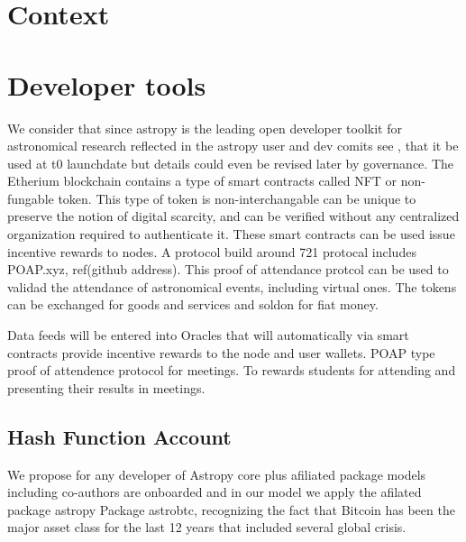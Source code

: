 \documentclass[final,5p,times,twocolumn,authoryear]{elsarticle}
\begin{document}
\section{Context}
\label{section:context}
%


\section{Developer tools}
\label{section:Eth721}
%
We consider that since astropy is the leading open developer toolkit for astronomical research reflected in the astropy  user and dev comits see \cite{ 2020ASPC..522..491T}, that it be used at t0 launchdate but details could even be revised later by governance.  The Etherium blockchain contains a type of smart contracts called NFT or non-fungable token.  This type of token is non-interchangable can be unique to preserve the notion of digital scarcity, and can be verified without any centralized organization required to authenticate it. These smart contracts can be used issue incentive rewards to nodes. A protocol build around 721 protocal includes POAP.xyz, ref(github address). This proof of attendance protcol can be used to validad the attendance of astronomical events, including virtual ones. The tokens can be exchanged for goods and services and soldon for fiat money.  


Data feeds will be entered into Oracles that will automatically via smart contracts provide incentive rewards to the node and user wallets.
%
POAP type proof of attendence protocol for meetings. To rewards students for attending and presenting their results in meetings.
%
\subsection{Hash Function Account}
We propose for any developer of Astropy core plus afiliated package models including co-authors are onboarded and in our model we apply the afilated package astropy Package astrobtc, recognizing the fact that Bitcoin has been the major asset class for the last 12 years that included several global crisis. 
%
\end{document}

